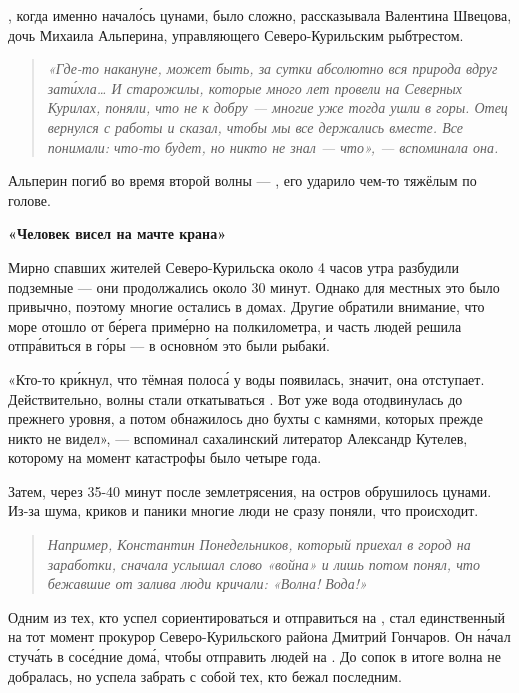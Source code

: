 , когда именно начал\'{о}сь цунами, было сложно, рассказывала Валентина Швецова, дочь Михаила Альперина, управляющего Северо-Курильским рыбтрестом.

\begin{quote}\it
    «Где-то накануне, может быть, за сутки абсолютно вся природа вдруг зат\'{и}хла… И старожилы, которые много лет провели на Северных Курилах, поняли, что не к добру --- многие уже тогда ушли в горы. Отец вернулся с работы и сказал, чтобы мы все держались вместе. Все понимали: что-то будет, но никто не знал --- что», --- вспоминала она.
\end{quote}


Альперин погиб во время второй волны --- , его ударило чем-то тяжёлым по голове.

\textbf{«Человек висел на мачте крана»}

Мирно спавших жителей Северо-Курильска около 4 часов утра разбудили подземные  --- они продолжались около 30 минут. Однако для местных это было привычно, поэтому многие остались в домах. Другие обратили внимание, что море отошло от б\'{е}рега прим\'{е}рно на полкилометра, и часть людей решила отпр\'{а}виться в г\'{о}ры --- в основн\'{о}м это были рыбак\'{и}.

«Кто-то кр\'{и}кнул, что тёмная полос\'{а} у  воды появилась, значит, она отступает. Действительно, волны стали откатываться . Вот уже вода отодвинулась до прежнего уровня, а потом обнажилось дно бухты с камнями, которых прежде никто не видел», --- вспоминал сахалинский литератор Александр Кутелев, которому на момент катастрофы было четыре года.

Затем, через 35-40 минут после землетрясения, на остров обрушилось цунами. Из-за шума, криков и паники многие люди не сразу поняли, что происходит.

\begin{quote}
    \it
    Например, Константин Понедельников, который приехал в город на заработки, сначала услышал слово «война» и лишь потом понял, что бежавшие от залива люди кричали: «Волна! Вода!»
\end{quote}

Одним из тех, кто успел сориентироваться и отправиться на , стал единственный на тот момент прокурор Северо-Курильского района Дмитрий Гончаров. Он н\'{а}чал стуч\'{а}ть в сос\'{е}дние дом\'{а}, чтобы отправить людей на . До сопок в итоге волна не добралась, но успела забрать с собой тех, кто бежал последним.


